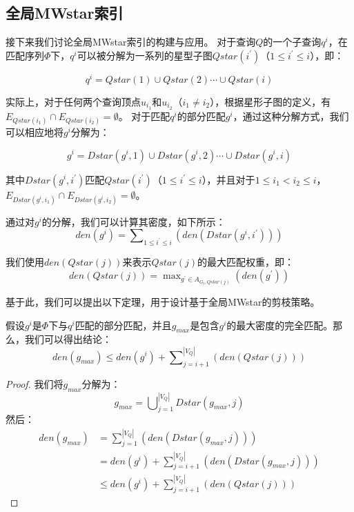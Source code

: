 \subsection{全局MWstar索引}
\label{mwstar:global}

接下来我们讨论全局MWstar索引的构建与应用。
对于查询$Q$的一个子查询$q^i$，在匹配序列$\Phi$下，$q^i$可以被分解为一系列的星型子图$Qstar(i^\prime)$（$1 \leq i^\prime \leq i$），即：

\[
	q^i = Qstar(1)\cup Qstar(2) \cdots \cup Qstar(i)
\]

实际上，对于任何两个查询顶点$u_{i_1}$和$u_{i_2}$（$i_1 \neq i_2$），根据星形子图的定义，有$E_{Qstar(i_1)} \cap E_{Qstar(i_2)} = \emptyset$。
对于匹配$q^i$的部分匹配$g^i$，通过这种分解方式，我们可以相应地将$g^i$分解为：

\begin{equation} \label{equation:dstar-decompose}
    g^i = Dstar(g^i, 1)\cup Dstar(g^i, 2) \cdots \cup Dstar(g^i, i)
\end{equation}

其中$Dstar(g^i, i^\prime)$匹配$Qstar(i^\prime)$（$1 \leq i^\prime \leq i$），并且对于$1 \leq i_1 < i_2 \leq i$，$E_{Dstar(g^i, i_1)} \cap E_{Dstar(g^i, i_2)} = \emptyset$。

通过对$g^i$的分解，我们可以计算其密度，如下所示：
\[
	den(g^i) = \sum\nolimits_{1\leq i^\prime\leq i} \left(den(Dstar(g^i,i^\prime))\right)
\] 

我们使用$den(Qstar(j))$来表示$Qstar(j)$的最大匹配权重，即：
\[
	den(Qstar(j)) = \max\nolimits_{g^\prime \in A_{G_t, Qstar(j)}} \left(den(g^\prime)\right)
\]


基于此，我们可以提出以下定理，用于设计基于全局MWstar的剪枝策略。
\begin{theorem} \label{theorem:global-mwstar}
假设$g^i$是$\Phi$下与$q^i$匹配的部分匹配，并且$g_{max}$是包含$g^i$的最大密度的完全匹配。那么，我们可以得出结论：
\[
	den(g_{max}) \leq den(g^i) + \sum\nolimits_{j=i+1}^{|V_Q|} \left(den(Qstar(j))\right)
\]

\end{theorem}

\begin{proof}
我们将$g_{max}$分解为：
\[
	g_{max} =   \bigcup\nolimits_{j=1}^{|V_Q|} Dstar(g_{max}, j)
\]
然后：
\begin{equation*}
    \begin{aligned}
      den(g_{max}) & =  \sum\nolimits_{j=1}^{|V_Q|} \left( den(Dstar(g_{max}, j)) \right)  \\
        & =  den(g^i) + \sum\nolimits_{j=i+1}^{|V_Q|} \left( den(Dstar(g_{max}, j)) \right) \\
        & \leq den(g^i) + \sum\nolimits_{j=i+1}^{|V_Q|} \left( den(Qstar(j)) \right) 
    \end{aligned}
  \end{equation*}
  \end{proof}

